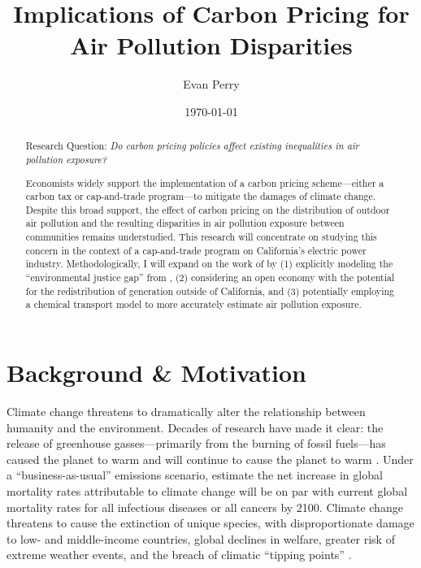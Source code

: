 \documentclass[11pt]{article}
\title{Implications of Carbon Pricing for Air Pollution Disparities}
\author{Evan Perry}
\date{\today}
\begin{document}
\maketitle
 
\renewcommand{\abstractname}{Summary}
\begin{abstract}
\noindent Research Question: \emph{Do carbon pricing policies affect existing inequalities in air pollution exposure?}

\bigskip
Economists widely support the implementation of a carbon pricing scheme---either a carbon tax or cap-and-trade program---to mitigate the damages of climate change. Despite this broad support, the effect of carbon pricing on the distribution of outdoor air pollution and the resulting disparities in air pollution exposure between communities remains understudied. This research will concentrate on studying this concern in the context of a cap-and-trade program on California's electric power industry. Methodologically, I will expand on the work of \cite{weber2021dynamic} by (1) explicitly modeling the ``environmental justice gap'' from \cite{hernandez2023environmental}, (2) considering an open economy with the potential for the redistribution of generation outside of California, and (3) potentially employing a chemical transport model to more accurately estimate air pollution exposure.


\end{abstract}

\doublespacing
\section*{Background \& Motivation}

Climate change threatens to dramatically alter the relationship between humanity and the environment. Decades of research have made it clear: the release of greenhouse gasses---primarily from the burning of fossil fuels---has caused the planet to warm and will continue to cause the planet to warm \citep{ipcc6_1}. Under a ``business-as-usual'' emissions scenario, \cite{carleton2022} estimate the net increase in global mortality rates attributable to climate change will be on par with current global mortality rates for all infectious diseases or all cancers by 2100. Climate change threatens to cause the extinction of unique species, with disproportionate damage to low- and middle-income countries, global declines in welfare, greater risk of extreme weather events, and the breach of climatic ``tipping points'' \citep{ipcc6_2}.
\end{document}
